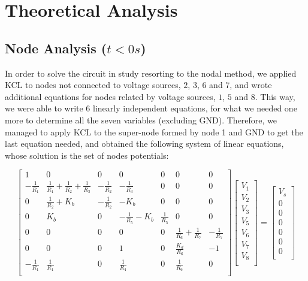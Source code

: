 \section{Theoretical Analysis}
\label{sec:analysis}

\subsection{Node Analysis ($t<0s$)}
\label{subsec:nodeanalysis}

In order to solve the circuit in study resorting to the nodal method, we applied KCL to nodes not connected to voltage sources, $2$, $3$, $6$ and $7$, and wrote additional equations for nodes related by voltage sources, $1$, $5$ and $8$. This way, we were able to write 6 linearly independent equations, for what we needed one more to determine all the seven variables (excluding GND). Therefore, we managed to apply KCL to the super-node formed by node 1 and GND to get the last equation needed, and obtained the following system of linear equations, whose solution is the set of nodes potentials:

\[
{\begin{bmatrix}
1 & 0 & 0 & 0 & 0 & 0 & 0\\
-\frac{1}{R_1} & \frac{1}{R_1}+\frac{1}{R_2}+\frac{1}{R_3} & -\frac{1}{R_2} & -\frac{1}{R_3} & 0 & 0 & 0\\
0 & \frac{1}{R_2}+K_b & -\frac{1}{R_2} & -K_b & 0 & 0 & 0\\
0 & K_b & 0 & -\frac{1}{R_5}-K_b & \frac{1}{R_5} & 0 & 0\\
0 & 0 & 0 & 0 & 0 & \frac{1}{R_6}+\frac{1}{R_7} & -\frac{1}{R_7}\\
0 & 0 & 0 & 1 & 0 & \frac{K_d}{R_6} & -1\\
-\frac{1}{R_1} & \frac{1}{R_1} & 0 & \frac{1}{R_4} & 0 & \frac{1}{R_6} & 0\\
            \end{bmatrix}
            }
{\begin{bmatrix}
V_1\\
V_2\\
V_3\\
V_5\\
V_6\\
V_7\\
V_8\\
            \end{bmatrix}
            }
    =
{\begin{bmatrix}
V_s\\
0\\
0\\
0\\
0\\
0\\
0\\
            \end{bmatrix}
            }
\]

